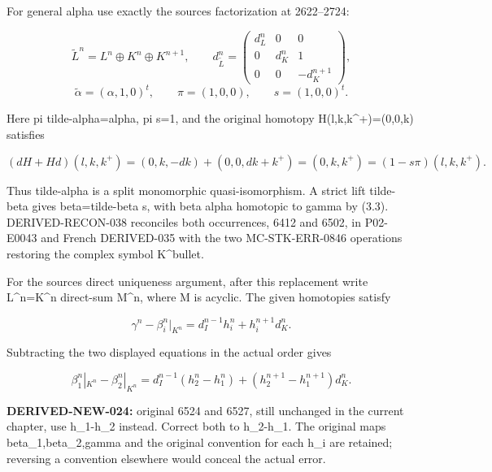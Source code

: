 \documentclass[11pt]{article}
\begin{document}
For general alpha use exactly the source\textquotesingle s factorization at 2622–\allowbreak{}2724:\allowbreak{}

\[
 \widetilde L^n=L^n\oplus K^n\oplus K^{n+1},\qquad
 d_{\widetilde L}^n=
 \begin{pmatrix}d_L^n&0&0\\0&d_K^n&1\\0&0&-d_K^{n+1}\end{pmatrix},
\] \[
 \widetilde\alpha=(\alpha,1,0)^t,\qquad
 \pi=(1,0,0),\qquad s=(1,0,0)^t.                         \tag{3.2}
\]

Here pi tilde-alpha\allowbreak{}=alpha,\allowbreak{} pi s\allowbreak{}=1,\allowbreak{} and the original homotopy H(l,\allowbreak{}k,\allowbreak{}k\textasciicircum{}\allowbreak{}+)\allowbreak{}\allowbreak{}=(0,\allowbreak{}0,\allowbreak{}k)\allowbreak{} satisfies

\[
 (dH+Hd)(l,k,k^+)=(0,k,-dk)+(0,0,dk+k^+)=(0,k,k^+)
                        =(1-s\pi)(l,k,k^+).             \tag{3.3}
\]

Thus tilde-alpha is a split monomorphic quasi-isomorphism. A strict lift tilde-beta gives beta\allowbreak{}=tilde-beta s,\allowbreak{} with beta alpha homotopic to gamma by (3.3)\allowbreak{}. DERIVED-RECON-038 reconciles both occurrences,\allowbreak{} 6412 and 6502,\allowbreak{} in P02-E0043 and French DERIVED-035 with the two MC-STK-ERR-0846 operations restoring the complex symbol K\^{}bullet.

For the source\textquotesingle s direct uniqueness argument,\allowbreak{} after this replacement write L\textasciicircum{}n\allowbreak{}=K\textasciicircum{}n direct-sum M\textasciicircum{}n,\allowbreak{} where M is acyclic. The given homotopies satisfy

\[
 \gamma^n-\beta_i^n|_{K^n}
       =d_I^{n-1}h_i^n+h_i^{n+1}d_K^n.
\]

Subtracting the two displayed equations in the actual order gives

\[
 \beta_1^n|_{K^n}-\beta_2^n|_{K^n}
 =d_I^{n-1}(h_2^n-h_1^n)
                  +(h_2^{n+1}-h_1^{n+1})d_K^n.          \tag{3.4}
\]

\textbf{DERIVED-NEW-024:\allowbreak{}} original 6524 and 6527,\allowbreak{} still unchanged in the current chapter,\allowbreak{} use h\_\allowbreak{}1-h\_\allowbreak{}2 instead. Correct both to h\_\allowbreak{}2-h\_\allowbreak{}1. The original maps beta\_\allowbreak{}1,\allowbreak{}beta\_\allowbreak{}2,\allowbreak{}gamma and the original convention for each h\_\allowbreak{}i are retained; reversing a convention elsewhere would conceal the actual error.
\end{document}
